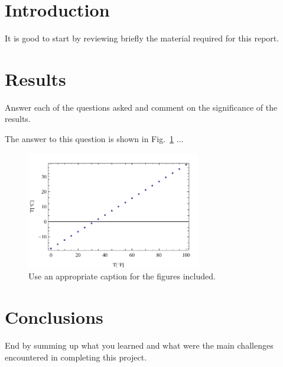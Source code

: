 \documentclass{article}
\author{\hwauthor}
\title{\hwtitle}
\date{\hwdate}
\begin{document}
\maketitle
\thispagestyle{fancy}

\section{Introduction}

It is good to start by reviewing briefly the material required for this report. 

\section{Results}

Answer each of the questions asked and comment on the significance of the results.

\bigskip
{}
\medskip

The answer to this question is shown in Fig.~\ref{fig:1} ...

\begin{figure}[b]
\begin{center}
\includegraphics[width=3in]{data.pdf}
\end{center}
\caption{Use an appropriate caption for the figures included.}
\label{fig:1}
\end{figure}

\section{Conclusions}

End by summing up what you learned and what were the main challenges encountered in completing this project.
\end{document}
